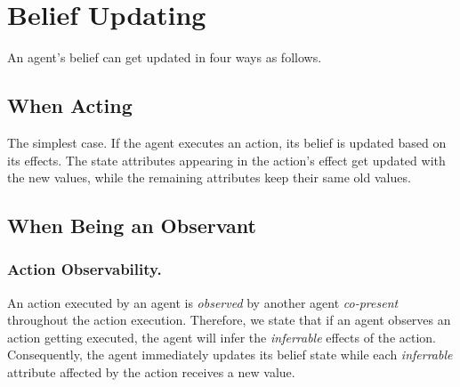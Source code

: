 \documentclass[letterpaper]{article} %
\begin{document}
\section{Belief Updating}
An agent's belief can get updated in four ways as follows. 

\subsection{When Acting}
The simplest case. If the agent executes an action, its belief is updated based on its effects. The state attributes appearing in the action's effect get updated with the new values, while the remaining attributes keep their same old values.

\subsection{When Being an Observant}

\subsubsection{Action Observability.}
An action executed by an agent is \textit{observed} by another agent \emph{co-present} throughout the action execution. Therefore, we state that if an agent observes an action getting executed, the agent will infer the \textit{inferrable} effects of the action.
Consequently, the agent immediately updates its belief state while each \textit{inferrable} attribute affected by the action receives a new value.  
\end{document}
